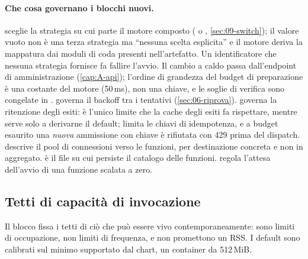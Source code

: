 \paragraph{Che cosa governano i blocchi nuovi.}
 sceglie la strategia su cui parte il motore
composto ( o , \cref{sec:09-switch}); il
valore vuoto non \`e una terza strategia ma ``nessuna scelta esplicita'' e il
motore deriva la mappatura dai moduli di coda presenti nell'artefatto. Un
identificatore che nessuna strategia fornisce fa fallire l'avvio. Il cambio a
caldo passa dall'endpoint di amministrazione (\cref{cap:A-api}); l'ordine di
grandezza del budget di preparazione \`e una costante del motore (50\,ms), non
una chiave, e le soglie di verifica sono congelate in
.
 governa il backoff tra i tentativi
(\cref{sec:06-riprova}).  governa la
ritenzione degli esiti:  \`e l'unico limite che la
cache degli esiti fa rispettare, mentre  serve solo a
derivarne il default;  limita le chiavi di idempotenza, e a
budget esaurito una \emph{nuova} ammissione con chiave \`e rifiutata con 429
prima del dispatch.  descrive il pool di
connessioni verso le funzioni, per destinazione concreta e non in aggregato.
 \`e il file su cui persiste il catalogo delle
funzioni.  regola l'attesa dell'avvio di una
funzione scalata a zero.

\subsection{Tetti di capacit\`a di invocazione}

Il blocco  fissa i tetti di ci\`o che pu\`o
essere vivo contemporaneamente: sono limiti di occupazione, non limiti di
frequenza, e non promettono un RSS. I default sono calibrati sul minimo
supportato dal chart, un container da 512\,MiB.

